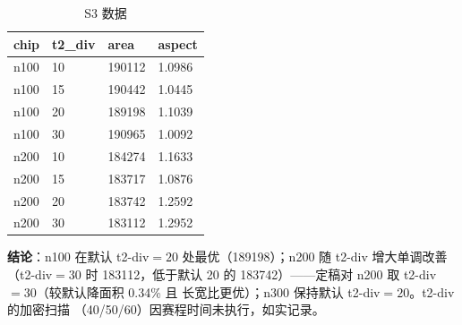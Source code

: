 \documentclass[12pt,a4paper]{article}
\begin{document}
  \begin{table}[H]
  \centering
  \caption{S3 数据}\label{tab:q1s3}
  \begin{tabular}{llll}
  \toprule
  chip & t2\_div & area & aspect \\
  \midrule
  n100 & 10 & 190112 & 1.0986 \\
  n100 & 15 & 190442 & 1.0445 \\
  n100 & 20 & 189198 & 1.1039 \\
  n100 & 30 & 190965 & 1.0092 \\
  n200 & 10 & 184274 & 1.1633 \\
  n200 & 15 & 183717 & 1.0876 \\
  n200 & 20 & 183742 & 1.2592 \\
  n200 & 30 & 183112 & 1.2952 \\
  \bottomrule
  \end{tabular}
  \end{table}

\textbf{结论}：n100 在默认 t2-div$=20$ 处最优（189198）；n200 随
t2-div 增大单调改善（t2-div$=30$ 时 183112，低于默认 20 的
183742）——定稿对 n200 取 t2-div$=30$（较默认降面积 0.34\% 且
长宽比更优）；n300 保持默认 t2-div$=20$。t2-div 的加密扫描
（40/50/60）因赛程时间未执行，如实记录。
\end{document}
